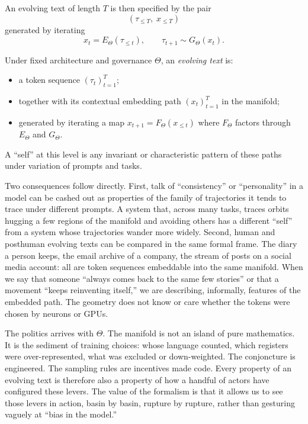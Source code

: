 \documentclass[12pt,a4paper]{report}
\begin{document}
An evolving text of length $T$ is then specified by the pair
\[
(\tau_{\leq T},\; x_{\leq T})
\]
generated by iterating
\[
x_t = E_\Theta(\tau_{\leq t}), \qquad \tau_{t+1} \sim G_\Theta(x_t).
\]

\begin{formalbox}[title={Evolving Text}]
Under fixed architecture and governance $\Theta$, an \emph{evolving text} is:
\begin{itemize}
  \item a token sequence $(\tau_t)_{t=1}^T$;
  \item together with its contextual embedding path $(x_t)_{t=1}^T$ in the manifold;
  \item generated by iterating a map $x_{t+1} = F_\Theta(x_{\leq t})$ where $F_\Theta$ factors through $E_\Theta$ and $G_\Theta$.
\end{itemize}
A ``self'' at this level is any invariant or characteristic pattern of these paths under variation of prompts and tasks.
\end{formalbox}

Two consequences follow directly. First, talk of ``consistency'' or ``personality'' in a model can be cashed out as properties of the family of trajectories it tends to trace under different prompts. A system that, across many tasks, traces orbits hugging a few regions of the manifold and avoiding others has a different ``self'' from a system whose trajectories wander more widely. Second, human and posthuman evolving texts can be compared in the same formal frame. The diary a person keeps, the email archive of a company, the stream of posts on a social media account: all are token sequences embeddable into the same manifold. When we say that someone ``always comes back to the same few stories'' or that a movement ``keeps reinventing itself,'' we are describing, informally, features of the embedded path. The geometry does not know or care whether the tokens were chosen by neurons or GPUs.

The politics arrives with $\Theta$. The manifold is not an island of pure mathematics. It is the sediment of training choices: whose language counted, which registers were over-represented, what was excluded or down-weighted. The conjoncture is engineered. The sampling rules are incentives made code. Every property of an evolving text is therefore also a property of how a handful of actors have configured these levers. The value of the formalism is that it allows us to see those levers in action, basin by basin, rupture by rupture, rather than gesturing vaguely at ``bias in the model.''
\end{document}
